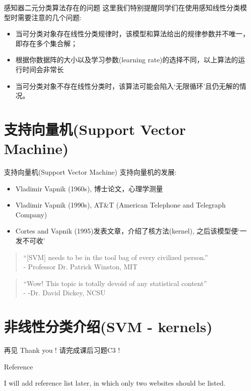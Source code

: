 \documentclass[handout]{ctexbeamer}
\begin{document}
\begin{frame}{感知器二元分类算法存在的问题}
	这里我们特别提醒同学们在使用感知线性分类模型时需要注意的几个问题: 
		\begin{itemize}
			\item 当可分类对象存在线性分类规律时，该模型和算法给出的规律参数并不唯一，即存在多个集合解；
			\item 根据你数据阵的大小以及学习参数(learning rate)的选择不同，以上算法的运行时间会非常长
			\item 当可分类对象不存在线性分类时，该算法可能会陷入`无限循环'且仍无解的情况。
		\end{itemize}
\end{frame}



\section{支持向量机(Support Vector Machine)}

\begin{frame}{支持向量机(Support Vector Machine)}
支持向量机的发展:
\begin{itemize}
	\item Vladimir Vapnik (1960s), 博士论文，心理学测量
	\item Vladimir Vapnik (1990s), AT\&T (American Telephone and Telegraph Company)
	\item Cortes and Vapnik (1995)发表文章，介绍了核方法(kernel), 之后该模型便`一发不可收'
	\end{itemize}
	
	\begin{quote}
		``[SVM] needs to be in the tool bag of every civilized person.'' \\
		\hfill - Professor Dr. Patrick Winston, MIT
	\end{quote}
	
	\begin{quote}
		``Wow! This topic is totally devoid of any statistical content'' \\
		\hfill - -Dr. David Dickey, NCSU
	\end{quote}
\end{frame}


\section{非线性分类介绍(SVM - kernels)}


\begin{frame}{再见}
	Thank you !  请完成课后习题C3 !
\end{frame}



\begin{frame}[allowframebreaks]{Reference}
  
  
  I will add reference list later, in which only two websites should be listed. 
\end{frame}
\end{document}
